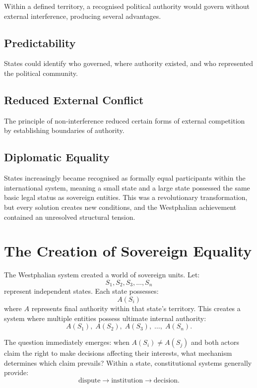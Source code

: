 \documentclass[11pt,openany]{book}
\theoremstyle{plain}
\theoremstyle{definition}
\begin{document}
Within a defined territory, a recognised political authority would govern without external interference, producing several advantages.

\subsection*{Predictability}

States could identify who governed, where authority existed, and who represented the political community.

\subsection*{Reduced External Conflict}

The principle of non-interference reduced certain forms of external competition by establishing boundaries of authority.

\subsection*{Diplomatic Equality}

States increasingly became recognised as formally equal participants within the international system, meaning a small state and a large state possessed the same basic legal status as sovereign entities. This was a revolutionary transformation, but every solution creates new conditions, and the Westphalian achievement contained an unresolved structural tension.

\section*{The Creation of Sovereign Equality}

The Westphalian system created a world of sovereign units. Let:
\[
S_1, S_2, S_3, \ldots, S_n
\]
represent independent states. Each state possesses:
\[
A(S_i)
\]
where \(A\) represents final authority within that state's territory. This creates a system where multiple entities possess ultimate internal authority:
\[
A(S_1), \; A(S_2), \; A(S_3), \; \ldots, \; A(S_n).
\]

The question immediately emerges: when \(A(S_i) \neq A(S_j)\) and both actors claim the right to make decisions affecting their interests, what mechanism determines which claim prevails? Within a state, constitutional systems generally provide:
\[
\text{dispute}
\longrightarrow
\text{institution}
\longrightarrow
\text{decision}.
\]
\end{document}
